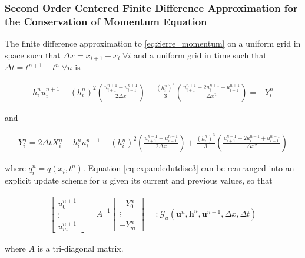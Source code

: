 \documentclass[SingleSpace,12pt,Proceedings]{Serre_ASCE}
\begin{document}
\subsubsection{Second Order Centered Finite Difference Approximation for the Conservation of Momentum Equation}
The finite difference approximation to \eqref{eq:Serre_momentum} on a uniform grid in space such that $\Delta x = x_{i+1} - x_i \; \forall i$ and a uniform grid in time such that $\Delta t = t^{n+1} - t^{n} \; \forall n$ is
\begin{linenomath*}
	\begin{gather}
	h^{n}_iu^{n+1}_i - \left(h^{n}_i\right)^2 \left(\frac{u^{n+1}_{i+1} -u^{n+1}_{i-1} }{2 \Delta x}\right) - \frac{\left(h^{n}_i\right)^3}{3}\left(\frac{u^{n+1}_{i+1} - 2u^{n+1}_{i} + u^{n+1}_{i-1} }{\Delta x^2}\right) = - Y^n_i
	\label{eq:expandedutdisc3}
	\end{gather}
\end{linenomath*}
and
\begin{linenomath*}
	\begin{gather*}
	Y_i^n = 2\Delta tX_i^{n} - h_i^{n}u_i^{n-1} + \left(h_i^{n}\right)^2\left(\frac{u^{n-1}_{i+1} -u^{n-1}_{i-1} }{2 \Delta x}\right) + \frac{\left(h_i^{n}\right)^3}{3}\left(\frac{u^{n-1}_{i+1} - 2u^{n-1}_{i} + u^{n-1}_{i-1} }{\Delta x^2}\right)
	\label{eq:expandfactor Xp}
	\end{gather*}
\end{linenomath*}
where $q_i^n = q(x_i,t^n)$. Equation \eqref{eq:expandedutdisc3} can be rearranged into an explicit update scheme for $u$ given its current and previous values, so that
\begin{linenomath*}
	\begin{gather}
	\left[\begin{array}{c}
	u^{n+1}_0 \\
	\vdots \\
	u^{n+1}_m \end{array}\right]
	= A^{-1} \left[\begin{array}{c}
	-Y^n_0 \\
	\vdots \\
	-Y^n_m \end{array}\right] =: \mathcal{G}_u\left(\boldsymbol{u}^n,\boldsymbol{h}^n, \boldsymbol{u}^{n-1}, \Delta x, \Delta t \right)
	\label{eq:FDcentforu}
	\end{gather}
\end{linenomath*}
where $A$ is a tri-diagonal matrix.
\end{document}

